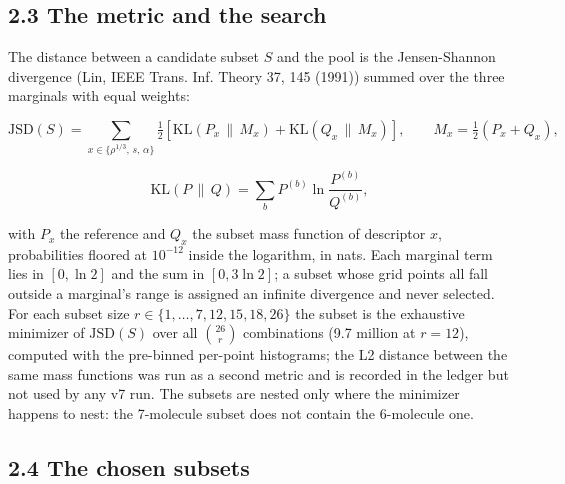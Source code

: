 \documentclass[10pt,a4paper]{article}
\begin{document}
\subsection*{2.3 The metric and the search}

The distance between a candidate subset $S$ and the pool is the Jensen-Shannon divergence (Lin, IEEE Trans. Inf. Theory 37, 145 (1991)) summed over the three marginals with equal weights:

\[
\mathrm{JSD}(S) = \sum_{x \in \{\rho^{1/3},\, s,\, \alpha\}} \tfrac12 \left[ \mathrm{KL}(P_x \,\|\, M_x) + \mathrm{KL}(Q_x \,\|\, M_x) \right], \qquad
M_x = \tfrac12 (P_x + Q_x),
\]

\[
\mathrm{KL}(P \,\|\, Q) = \sum_b P^{(b)} \ln \frac{P^{(b)}}{Q^{(b)}},
\]

with $P_x$ the reference and $Q_x$ the subset mass function of descriptor $x$, probabilities floored at $10^{-12}$ inside the logarithm, in nats. Each marginal term lies in $[0, \ln 2]$ and the sum in $[0, 3\ln 2]$; a subset whose grid points all fall outside a marginal's range is assigned an infinite divergence and never selected. For each subset size $r \in \{1, \ldots, 7, 12, 15, 18, 26\}$ the subset is the exhaustive minimizer of $\mathrm{JSD}(S)$ over all $\binom{26}{r}$ combinations (9.7 million at $r = 12$), computed with the pre-binned per-point histograms; the L2 distance between the same mass functions was run as a second metric and is recorded in the ledger but not used by any v7 run. The subsets are nested only where the minimizer happens to nest: the 7-molecule subset does not contain the 6-molecule one.

\subsection*{2.4 The chosen subsets}
\end{document}
